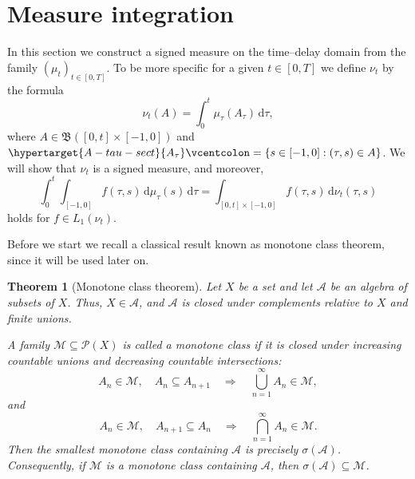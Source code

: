 \documentclass[reqno]{amsart}
\theoremstyle{plain}
\newtheorem{theorem}{Theorem}[section]
\numberwithin{equation}{section}
\numberwithin{definition}{section}
\newcommand{\dd}{\ensuremath{\mathrm{d}}}
\begin{document}
\section{Measure integration}\label{sec:Measure-integration-and-disintegration}
In this section we construct a signed measure on the time–delay domain from the family $(\mu_t)_{t\in[0,T]}$. To be more specific for a given $t\in[0,T]$ we define $\nu_t$ by the formula 
\begin{equation*}
    \nu_t(A)= \int_{0}^t \mu_{\tau}(A_{\tau})\, \dd \tau, 
\end{equation*}
where $A\in\mathfrak{B}([0,t]\times [-1,0])$  and $\hypertarget{A-tau-sect}{A_{\tau}}\vcentcolon =\{s\in [-1,0]: (\tau,s)\in A\}$. We will show that $\nu_t$ is a signed measure, and moreover, 
\begin{equation}\label{eq:measure-integration-eq}
  \int_0^t \int_{[-1,0]} f(\tau,s) \,\dd \mu_{\tau}(s) \,\dd\tau = \int_{[0,t]\times [-1,0]} f(\tau,s) \, \dd \nu_t(\tau,s)  
\end{equation} 
holds for $f\in L_1(\nu_t)$.    

Before we start we recall a classical result known as monotone class theorem, since it will be used later on. 

\begin{theorem}[Monotone class theorem]
\label{thm:monotone-class}
Let $X$ be a set and let $\mathcal A$ be an algebra
of subsets of $X$. Thus, $X\in\mathcal A$, and
$\mathcal A$ is closed under complements relative to $X$
and finite unions.

A family $\mathcal M\subseteq\mathcal P(X)$ is called
a monotone class if it is closed under increasing
countable unions and decreasing countable intersections:
\begin{equation*}
    A_n\in\mathcal M,\quad A_n\subseteq A_{n+1}
    \quad\Longrightarrow\quad
    \bigcup_{n=1}^{\infty}A_n\in\mathcal M,
\end{equation*}
and
\begin{equation*}
    A_n\in\mathcal M,\quad A_{n+1}\subseteq A_n
    \quad\Longrightarrow\quad
    \bigcap_{n=1}^{\infty}A_n\in\mathcal M.
\end{equation*}
Then the smallest monotone class containing $\mathcal A$
is precisely $\sigma(\mathcal A)$. Consequently, if $\mathcal M$ is a monotone class
containing $\mathcal A$, then $\sigma(\mathcal A)\subseteq\mathcal M$. 
\end{theorem}
\end{document}
